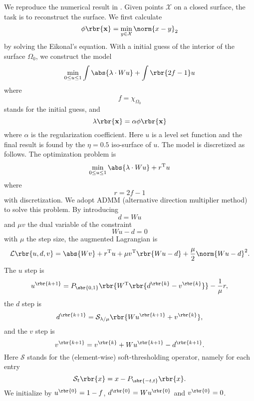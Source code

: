 \documentclass[english, nochinese]{pnote}
\begin{document}
We reproduce the numerical result in \parencite{dong_wavelet_2011}. Given points $\mathcal{X}$ on a closed surface, the task is to reconstruct the surface. We first calculate
\begin{equation}
\phi \rbr{\mathbf{x}} = \min_{ y \in \mathcal{X} } \norm{ x - y }_2
\end{equation}
by solving the Eikonal's equation. With a initial guess of the interior of the surface $\Omega_0$, we construct the model
\begin{equation}
\min_{ 0 \le u \le  1 } \int \abs{ \lambda \cdot W u } + \int \rbr{ 2 f - 1 } u
\end{equation}
where
\begin{equation}
f = \chi_{\Omega_0}
\end{equation}
stands for the initial guess, and
\begin{equation}
\lambda \rbr{\mathbf{x}} = \alpha \phi \rbr{\mathbf{x}}
\end{equation}
where $\alpha$ is the regularization coefficient. Here $u$ is a level set function and the final result is found by the $ \eta = 0.5 $ iso-surface of $u$. The model is discretized as follows. The optimization problem is
\begin{equation}
\min_{ 0 \le u \le 1 } \abs{ \lambda \cdot W u } + r^{\text{T}} u
\end{equation}
where
\begin{equation}
r = 2 f - 1
\end{equation}
with discretization. We adopt ADMM (alternative direction multiplier method) to solve this problem. By introducing
\begin{equation}
d = W u
\end{equation}
and $ \mu v $ the dual variable of the constraint
\begin{equation}
W u - d = 0
\end{equation}
with $\mu$ the step size, the augmented Lagrangian is
\begin{equation}
\mathcal{L} \rbr{ u, d, v } = \abs{ W v } + r^{\text{T}} u + \mu v^{\text{T}} \rbr{ W u - d } + \frac{\mu}{2} \norm{ W u - d }^2.
\end{equation}
The $u$ step is
\begin{equation}
u^{\rbr{ k + 1 }} = P_{\sbr{ 0, 1 }} \rbr{ W^{\text{T}} \rbr{ d^{\rbr{k}} - v^{\rbr{k}} } } - \frac{1}{\mu} r,
\end{equation}
the $d$ step is
\begin{equation}
d^{\rbr{ k + 1 }} = \mathcal{S}_{ \lambda / \mu } \rbr{ W u^{\rbr{ k + 1 }} + v^{\rbr{k}} },
\end{equation}
and the $v$ step is
\begin{equation}
v^{\rbr{ k + 1 }} = v^{\rbr{k}} + W u^{\rbr{ k + 1 }} - d^{\rbr{ k + 1 }}.
\end{equation}
Here $\mathcal{S}$ stands for the (element-wise) soft-thresholding operator, namely for each entry
\begin{equation}
\mathcal{S}_t \rbr{x} = x - P_{\sbr{ -t, t }} \rbr{x}.
\end{equation}
We initialize by $ u^{\rbr{0}} = 1 - f $, $ d^{\rbr{0}} = W u^{\rbr{0}} $ and $ v^{\rbr{0}} = 0 $.
\end{document}
